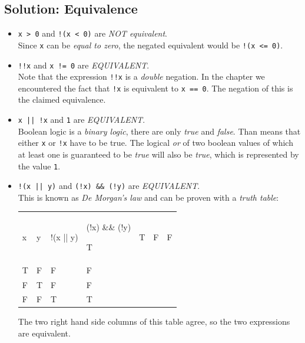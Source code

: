 \subsection*{Solution: Equivalence}
\begin{itemize}
\item \texttt{x > 0} and \texttt{!(x < 0)} are \emph{NOT equivalent}.\\
	Since \texttt{x} can be \emph{equal to zero}, the negated equivalent would be \texttt{!(x <= 0)}.

\item \texttt{!!x} and \texttt{x != 0} are \emph{EQUIVALENT}.\\
	Note that the expression \texttt{!!x} is a \emph{double} negation. In the chapter we encountered the fact that \texttt{!x} is equivalent to \texttt{x == 0}.
	The negation of this is the claimed equivalence.

\item \texttt{x || !x} and \texttt{1} are \emph{EQUIVALENT}.\\
	Boolean logic is a \emph{binary logic}, \ie there are only \emph{true} and \emph{false}. Than means that either \texttt{x} or \texttt{!x} have to be true.
	The logical \emph{or} of two boolean values of which at least one is guaranteed to be \emph{true} will also be \emph{true}, which is represented by the value \texttt{1}.
	
\item \texttt{!(x || y)} and \texttt{(!x) \&\& (!y)} are \emph{EQUIVALENT}.\\
	This is known as \emph{De Morgan's law} and can be proven with a \emph{truth table}:\\
	{
		\begin{tabularx}
			{.51\linewidth}
			{NN|WW}
			x & y &  !(x || y) & (!x) \&\& (!y) \tabcrlf
			
			T & T &          F & F \\
			T & F &          F & F \\
			F & T &          F & F \\
			F & F &          T & T \\
			
		\end{tabularx}
	}
	
	The two right hand side columns of this table agree, so the two expressions are equivalent.
	

\end{itemize}
